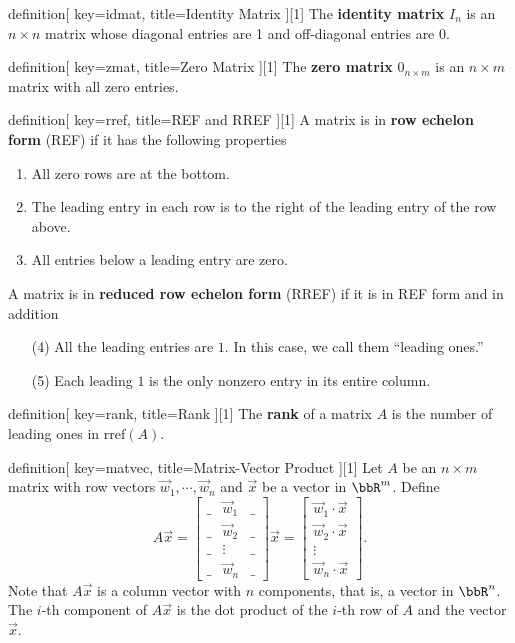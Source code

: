 \begin{SaveConcept}{definition}[
		key=idmat,
		title={Identity Matrix}
	][1]
        The \textbf{identity matrix} $I_n$ is an $n\times n$ matrix whose diagonal entries are 1 and off-diagonal entries are $0$.
\end{SaveConcept}


\begin{SaveConcept}{definition}[
		key=zmat,
		title={Zero Matrix}
	][1]
        The \textbf{zero matrix} $0_{n\times m}$ is an $n\times m$ matrix with all zero entries.
\end{SaveConcept}

 
\begin{SaveConcept}{definition}[
		key=rref,
		title={REF and RREF}
	][1]
    A matrix is in \textbf{row echelon form} (REF) if it has the following properties
	\begin{enumerate}
		\item All zero rows are at the bottom.
		\item The leading entry in each row is to the right of the leading entry of the row above.
		\item All entries below a leading entry are zero.
	\end{enumerate}
	
	A matrix is in \textbf{reduced row echelon form} (RREF) if it is in REF form and in addition
	\begin{enumerate}
		\item [(4)]  All the leading entries are $1$. In this case, we call them ``leading ones.''
		\item [(5)] Each leading $1$ is the only nonzero entry in its entire column.  
	\end{enumerate}
\end{SaveConcept}


\begin{SaveConcept}{definition}[
		key=rank,
		title={Rank}
	][1]
	The \textbf{rank} of a matrix $A$ is the number of leading ones in  $\mathrm{rref} (A)$.
\end{SaveConcept}


\begin{SaveConcept}{definition}[
		key=matvec,
		title={Matrix-Vector Product}
	][1]
        Let $A$ be an $n\times m$ matrix with row vectors $\vec w_1,\cdots,\vec w_n$ and $\vec x$ be a vector in $\bbR^m$. Define 
	$$
	A\vec x=\begin{bmatrix}
		\_&\vec w_1&\_\\
		\_&\vec w_2&\_\\
		\_&\vdots&\_\\
		\_&\vec w_n&\_
	\end{bmatrix}\vec x=\begin{bmatrix}
		\vec w_1\cdot \vec x\\\vec w_2\cdot \vec x\\\vdots\\\vec w_n\cdot\vec x
	\end{bmatrix}.
	$$
	Note that $A\vec x$ is a column vector with $n$ components, that is, a vector in $\bbR^n$. The $i$-th component of $A\vec x$ is the dot product of the $i$-th row of $A$ and the vector $\vec x$.
\end{SaveConcept}


